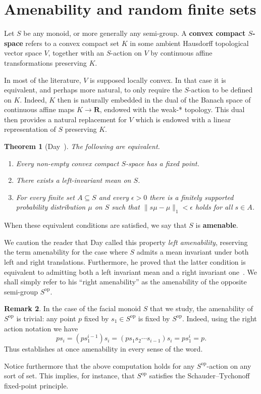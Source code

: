 \documentclass[12pt, pdflatex]{amsart}
\newtheorem{theorem}{Theorem}
\theoremstyle{definition}
\newtheorem{remark}[theorem]{Remark}
\numberwithin{equation}{section}
\numberwithin{theorem}{section}
\newcommand{\RR}{\mathbf{R}}
\begin{document}
\section{Amenability and random finite sets}\label{sec:amen}
Let $S$ be any monoid, or more generally any semi-group. A \textbf{convex compact $S$-space} refers to a convex compact set $K$ in some ambient Hausdorff topological vector space $V$, together with an $S$-action on $V$ by continuous affine transformations preserving $K$.

In most of the literature, $V$ is supposed locally convex. In that case it is equivalent, and perhaps more natural, to only require the $S$-action to be defined on $K$. Indeed, $K$ then is naturally embedded in the dual of the Banach space of continuous affine maps $K\to \RR$, endowed with the weak-* topology. This dual then provides a natural replacement for $V$ which is endowed with a linear representation of $S$ preserving $K$.

\begin{theorem}[Day~\cites{Day57, Day61}]\label{thm:Day}
The following are equivalent.
\begin{enumerate}
\item Every non-empty convex compact $S$-space has a fixed point.\label{pt:Day:fixed}
\item There exists a left-invariant mean on $S$.\label{pt:Day:mean}
\item For every finite set $A\subseteq S$ and every $\epsilon >0$ there is a finitely supported probability distribution $\mu$ on $S$ such that $\| s \mu -  \mu \|_1 < \epsilon$ holds for all $s\in A$.\label{pt:Day:Reiter}
\end{enumerate}
\end{theorem}

When these equivalent conditions are satisfied, we say that $S$ is \textbf{amenable}.

We caution the reader that Day called this property \emph{left amenability}, reserving the term amenability for the case where $S$ admits a mean invariant under both left and right translations. Furthermore, he proved that the latter condition is equivalent to admitting both a left invariant mean and a right invariant one~\cite[\S6]{Day57}. We shall simply refer to his ``right amenability'' as the amenability of the opposite semi-group $S^\mathrm{op}$.

\begin{remark}\label{rem:Sop}
In the case of the facial monoid $S$ that we study, the amenability of  $S^\mathrm{op}$ is trivial: any point $p$ fixed by $s_1\in S^\mathrm{op}$ is fixed by $S^\mathrm{op}$. Indeed, using the right action notation we have
\[
p s_i = (p s_1^{i-1}) s_i = (p s_1 s_2 \cdots s_{i-1}) s_i = p s_1^i = p.
\]
Thus  establishes at once amenability in every sense of the word.

Notice furthermore that the above computation holds for any $S^\mathrm{op}$-action on any sort of set. This implies, for instance, that $S^\mathrm{op}$ satisfies the Schauder--Tychonoff fixed-point principle.
\end{remark}
\end{document}
